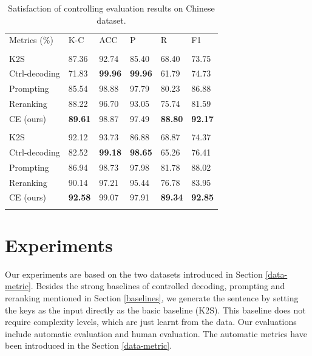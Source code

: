 \documentclass[11pt]{article}
\begin{document}
\begin{table}[thb!]
	\small
	\centering
	\renewcommand\arraystretch{1.2}
    \begin{tabular}{L{1.8cm}|C{0.7cm}|C{0.6cm}|C{0.6cm}|C{0.6cm}|C{0.6cm}}
	\Xhline{1pt}
	Metrics (\%) & K-C & ACC & P & R & F1 \\
	\Xhline{1pt}
	 \\
	\hline
	K2S & 87.36	& 92.74 & 85.40 & 68.40 & 73.75 \\
	\hline
	Ctrl-decoding & 71.83 & \textbf{99.96} & \textbf{99.96} & 61.79 & 74.73 \\
	Prompting & 85.54 & 98.88 & 97.79 & 80.23 & 86.88\\
	Reranking & 88.22 & 96.70 & 93.05 & 75.74 & 81.59 \\
	\hline
	CE (ours) & \textbf{89.61} & 98.87 & 97.49 & \textbf{88.80} & \textbf{92.17} \\
	\Xhline{1pt}
	 \\
	\hline
	K2S & 92.12 & 93.73 & 86.88 & 68.87 & 74.37 \\
	\hline
	Ctrl-decoding & 82.52 & \textbf{99.18} & \textbf{98.65} & 65.26 & 76.41 \\
	Prompting & 86.94 & 98.73 & 97.98 & 81.78 & 88.02 \\
	Reranking & 90.14 & 97.21 & 95.44 & 76.78 & 83.95 \\
	\hline
	CE (ours) & \textbf{92.58} & 99.07 & 97.91 & \textbf{89.34} & \textbf{92.85} \\
	\Xhline{1pt}
	\end{tabular}
	\caption{Satisfaction of controlling evaluation results on Chinese dataset.}
	\label{table6}
\end{table}

\section{Experiments}
Our experiments are based on the two datasets introduced in Section \ref{data-metric}. Besides the strong baselines of controlled decoding, prompting and reranking mentioned in Section \ref{baselines}, we generate the sentence by setting the keys as the input directly as the basic baseline (K2S). This baseline does not require complexity levels, which are just learnt from the data. Our evaluations include automatic evaluation and human evaluation. The automatic metrics have been introduced in the Section \ref{data-metric}. 
\end{document}
